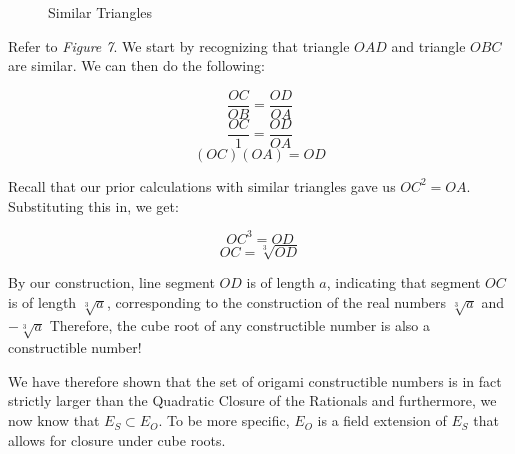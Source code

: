 \documentclass[]{article}
\begin{document}
        \begin{figure}[t]
        	\centering
        	\caption{Similar Triangles} \label{figure 7}
        \end{figure}
        
    
    Refer to \emph{Figure 7}. We start by recognizing that triangle $OAD$ and triangle $OBC$ are similar. We can then do the following:
    
    \[\frac{OC}{OB}=\frac{OD}{OA}\]
    \[\frac{OC}{1}=\frac{OD}{OA}\]
    \[(OC)(OA)=OD\]
    
    Recall that our prior calculations with similar triangles gave us $OC^2=OA$. Substituting this in, we get:
    
    \[OC^3=OD\]
    \[OC=\sqrt[3]{OD}\]
    
    By our construction, line segment $OD$ is of length $a$, indicating that segment $OC$ is of length $\sqrt[3]{a}$, corresponding to the construction of the real numbers $\sqrt[3]{a}$ and $-\sqrt[3]{a}$ Therefore, the cube root of any constructible number is also a constructible number!
    
    We have therefore shown that the set of origami constructible numbers is in fact strictly larger than the Quadratic Closure of the Rationals and furthermore, we now know that $E_S \subset E_O$. To be more specific, $E_O$ is a field extension of $E_S$ that allows for closure under cube roots.
    
\end{document}
